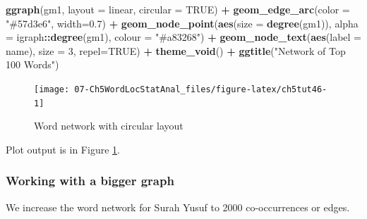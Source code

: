 \documentclass[
]{article}
\newenvironment{Shaded}{\begin{snugshade}}{\end{snugshade}}
\newcommand{\AttributeTok}[1]{\textcolor[rgb]{0.13,0.29,0.53}{#1}}
\newcommand{\ConstantTok}[1]{\textcolor[rgb]{0.56,0.35,0.01}{#1}}
\newcommand{\DecValTok}[1]{\textcolor[rgb]{0.00,0.00,0.81}{#1}}
\newcommand{\FloatTok}[1]{\textcolor[rgb]{0.00,0.00,0.81}{#1}}
\newcommand{\FunctionTok}[1]{\textcolor[rgb]{0.13,0.29,0.53}{\textbf{#1}}}
\newcommand{\NormalTok}[1]{#1}
\newcommand{\SpecialCharTok}[1]{\textcolor[rgb]{0.81,0.36,0.00}{\textbf{#1}}}
\newcommand{\StringTok}[1]{\textcolor[rgb]{0.31,0.60,0.02}{#1}}
\begin{document}
\begin{Shaded}
\begin{Highlighting}[]
\FunctionTok{ggraph}\NormalTok{(gm1, }\AttributeTok{layout =} \StringTok{\textquotesingle{}linear\textquotesingle{}}\NormalTok{, }\AttributeTok{circular =} \ConstantTok{TRUE}\NormalTok{) }\SpecialCharTok{+} 
     \FunctionTok{geom\_edge\_arc}\NormalTok{(}\AttributeTok{color =} \StringTok{"\#57d3e6"}\NormalTok{, }\AttributeTok{width=}\FloatTok{0.7}\NormalTok{) }\SpecialCharTok{+}
     \FunctionTok{geom\_node\_point}\NormalTok{(}\FunctionTok{aes}\NormalTok{(}\AttributeTok{size =} \FunctionTok{degree}\NormalTok{(gm1)), }\AttributeTok{alpha =}\NormalTok{ igraph}\SpecialCharTok{::}\FunctionTok{degree}\NormalTok{(gm1), }
                     \AttributeTok{colour =} \StringTok{"\#a83268"}\NormalTok{) }\SpecialCharTok{+}
     \FunctionTok{geom\_node\_text}\NormalTok{(}\FunctionTok{aes}\NormalTok{(}\AttributeTok{label =}\NormalTok{ name), }\AttributeTok{size =} \DecValTok{3}\NormalTok{, }\AttributeTok{repel=}\ConstantTok{TRUE}\NormalTok{) }\SpecialCharTok{+}
     \FunctionTok{theme\_void}\NormalTok{() }\SpecialCharTok{+}
     \FunctionTok{ggtitle}\NormalTok{(}\StringTok{"Network of Top 100 Words"}\NormalTok{)}
\end{Highlighting}
\end{Shaded}

\begin{figure}

{\centering \texttt{[image: 07-Ch5WordLocStatAnal\_files/figure-latex/ch5tut46-1]} 

}

\caption{Word network with circular layout}\label{fig:ch5tut46}
\end{figure}

Plot output is in Figure \ref{fig:ch5tut46}.

\hypertarget{working-with-a-bigger-graph}{%
\subsubsection{Working with a bigger graph}\label{working-with-a-bigger-graph}}

We increase the word network for Surah Yusuf to 2000 co-occurrences or edges.
\end{document}
